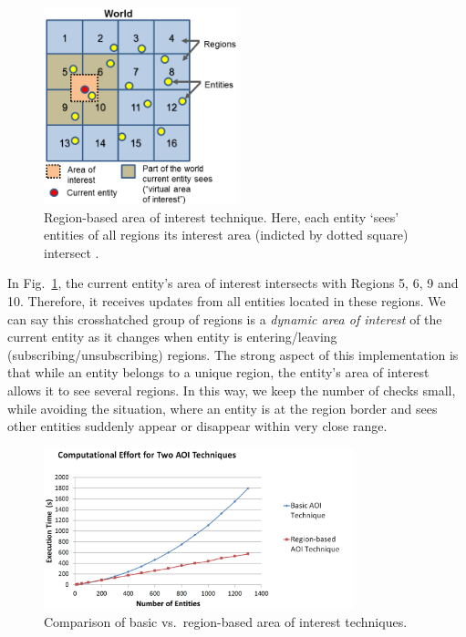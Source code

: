 \documentclass[]{elsarticle}
\begin{document}
\begin{figure}[t]
\centering
\includegraphics[width=0.5\textwidth]{acm-vrst13-img/DiVE_area_of_interest.png}
\caption{Region-based area of interest technique. Here, each entity `sees' entities of all regions its interest area (indicted by dotted square) intersect \cite{Prendinger+others.2014}.}
\label{fig:DiVE_area}
\end{figure}

In Fig.~\ref{fig:DiVE_area}, the current entity's area of interest intersects with Regions 5, 6, 9 and 10. Therefore, it receives updates from all entities located in these regions. We can say this crosshatched group of regions is a \textit{dynamic area of interest\/} of the current entity as it changes when entity is entering/leaving (subscribing/unsubscribing) regions. The strong aspect of this implementation is that while an entity belongs to a unique region, the entity's area of interest allows it to see several regions.
In this way, we keep the number of checks small, while avoiding the situation, where an entity is at the region border and sees other entities suddenly appear or disappear within very close range.

\begin{figure}[t]
\centering
\includegraphics[width=0.8\textwidth]{acm-vrst13-img/area_comparison.png}
\caption{Comparison of basic vs.~region-based area of interest techniques.}
\label{fig:compare_matlab}
\end{figure}
\end{document}
